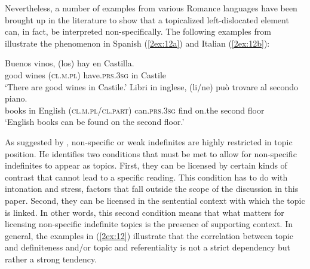 \documentclass[output=paper]{langsci/langscibook}
\begin{document}
Nevertheless, a number of examples from various Romance languages have been brought up in the literature to show that a topicalized left-dislocated element can, in fact, be interpreted non-specifically. The following examples from \cite{leonetti:10} illustrate the phenomenon in Spanish (\ref{2ex:12a}) and Italian (\ref{2ex:12b}):

\begin{exe}
\ex\label{2ex:12}
	\begin{xlista}
	\ex\label{2ex:12a}
	\gll	Buenos	vinos, 	(los) 				hay 				en	Castilla. \\
		good 	wines	({\textsc{cl.m.pl}}) 	have.{\textsc{prs.3sg}}	in 	Castile \\
	\glt 	`There are good wines in Castile.'
	\ex\label{2ex:12b}
	\gll	Libri 		in	inglese,	{(li/ne)} 						può 				trovare	al 	 	secondo	piano. \\
		books 	in 	English 	{({\textsc{cl.m.pl}}/{\textsc{cl.part}})}	can.{\textsc{prs.3sg}}	find		on.the	second 	floor \\
	\glt	`English books can be found on the second floor.'
	\end{xlista}
\end{exe}

As suggested by \cite{leonetti:10}, non-specific or weak indefinites are highly restricted in topic position. He identifies two conditions that must be met to allow for non-specific indefinites to appear as topics. First, they can be licensed by certain kinds of contrast that cannot lead to a specific reading. This condition has to do with intonation and stress, factors that fall outside the scope of the discussion in this paper. Second, they can be licensed in the sentential context with which the topic is linked. In other words, this second condition means that what matters for licensing non-specific indefinite topics is the presence of supporting context. In general, the examples in (\ref{2ex:12}) illustrate that the correlation between topic and definiteness and/or topic and referentiality is not a strict dependency but rather a strong tendency. 
\end{document}

